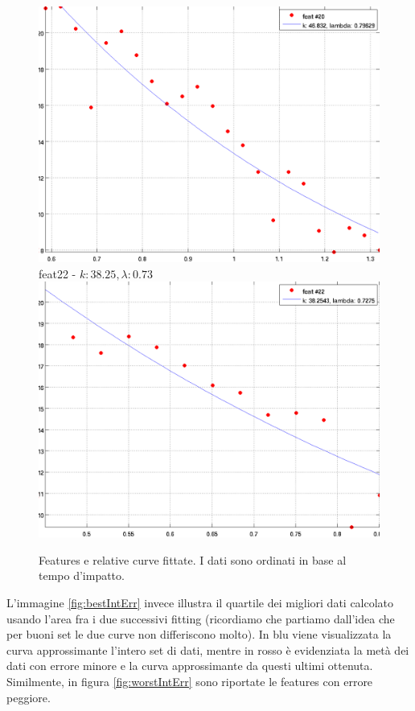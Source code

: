 \documentclass[12pt]{report}
\begin{document}
\begin{figure}[H]
\begin{minipage}[t]{0.5\linewidth}
	\includegraphics[scale=\imFeat]{images/feat20}\\
	feat22 - $k: 38.25, \lambda: 0.73 $\\
	\includegraphics[scale=\imFeat]{images/feat22}\\
\end{minipage}
\caption[short]{Features e relative curve fittate. I dati sono ordinati in base al tempo d'impatto.}
\label{fig:feats4}
\end{figure}



\newapage
\noindent L'immagine \ref{fig:bestIntErr} invece illustra il quartile dei migliori dati calcolato usando l'area fra i due successivi fitting (ricordiamo che partiamo dall'idea che per buoni set le due curve non differiscono molto). In blu viene visualizzata la curva approssimante l'intero set di dati, mentre in rosso \`e evidenziata la met\`a dei dati con errore minore e la curva approssimante da questi ultimi ottenuta. Similmente, in figura \ref{fig:worstIntErr} sono riportate le features con errore peggiore.\\
\end{document}
